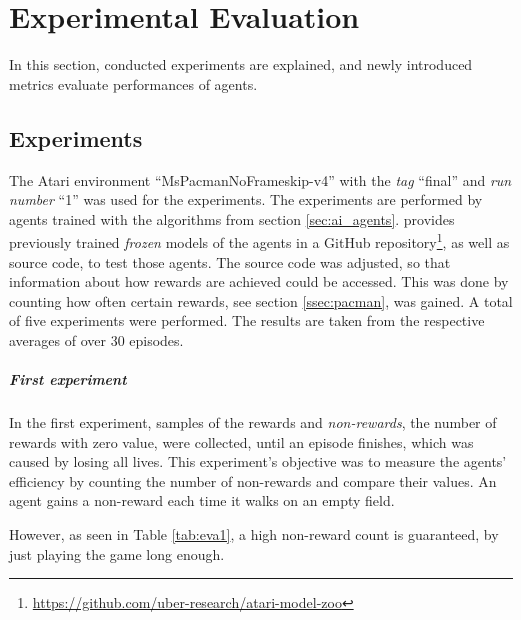 \chapter{Experimental Evaluation} \label{sec:exev}
In this section, conducted experiments are explained, and newly introduced metrics evaluate performances of agents.

\section{Experiments}
The Atari environment ``MsPacmanNoFrameskip-v4'' with the \textit{tag} ``final'' and \textit{run number} ``1'' was used for the experiments. The experiments are performed by agents trained with the algorithms from section \ref{sec:ai_agents}.  provides previously trained \textit{frozen} models of the agents in a GitHub repository\footnote{\url{https://github.com/uber-research/atari-model-zoo}}, as well as source code, to test those agents. The source code was adjusted, so that information about how rewards are achieved could be accessed. This was done by counting how often certain rewards, see section \ref{ssec:pacman}, was gained. A total of five experiments were performed. The results are taken from the respective averages of over 30 episodes. 

\paragraph{First experiment}
In the first experiment, samples of the rewards and \textit{non-rewards}, the number of rewards with zero value, were collected, until an episode finishes, which was caused by losing all lives. This experiment's objective was to measure the agents' efficiency by counting the number of non-rewards and compare their values. An agent gains a non-reward each time it walks on an empty field.

\begin{table}[H]
	\caption[Average achieved results in 30 episodes]{Average achieved results from agents across 30 episodes}
	\centering
	\label{tab:eva1}
\end{table} 
However, as seen in Table \ref{tab:eva1}, a high non-reward count is guaranteed, by just playing the game long enough.

